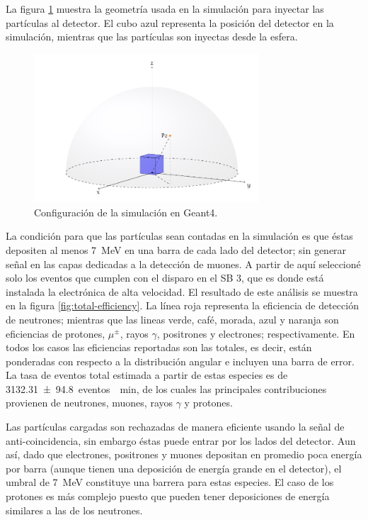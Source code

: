 La figura \ref{fig:sim-setup} muestra la geometría usada en la simulación para inyectar las partículas al detector. El cubo azul representa la posición del detector en la simulación, mientras que las partículas son inyectas desde la esfera.

\begin{figure}
        \centering
        \includegraphics[width=0.75\textwidth]{sim-setup.pdf}
        \caption{Configuración de la simulación en Geant4.}
        \label{fig:sim-setup}
\end{figure}

La condición para que las partículas sean contadas en la simulación es que éstas depositen al menos \SI{7}{\mega\electronvolt} en una barra de cada lado del detector; sin generar señal en las capas dedicadas a la detección de muones. A partir de aquí seleccioné solo los eventos que cumplen con el disparo en el SB \num{3}, que es donde está instalada la electrónica de alta velocidad. El resultado de este análisis se muestra en la figura \ref{fig:total-efficiency}. La línea roja representa la eficiencia de detección de neutrones; mientras que las lineas verde, café, morada, azul y naranja son eficiencias de protones, $\mu^{\pm}$, rayos $\gamma$, positrones y electrones; respectivamente. En todos los casos las eficiencias reportadas son las totales, es decir, están ponderadas con respecto a la distribución angular e incluyen una barra de error. La tasa de eventos total estimada a partir de estas especies es de \SI{3132.31(9480)}{eventos \per\minute}, de los cuales las principales contribuciones provienen de neutrones, muones, rayos $\gamma$ y protones.

Las partículas cargadas son rechazadas de manera eficiente usando la señal de anti-coincidencia, sin embargo éstas puede entrar por los lados del detector. Aun así, dado que electrones, positrones y muones depositan en promedio poca energía por barra (aunque tienen una deposición de energía grande en el detector), el umbral de \SI{7}{\mega\electronvolt} constituye una barrera para estas especies. El caso de los protones es más complejo
puesto que pueden tener deposiciones de energía similares a las de los neutrones.

